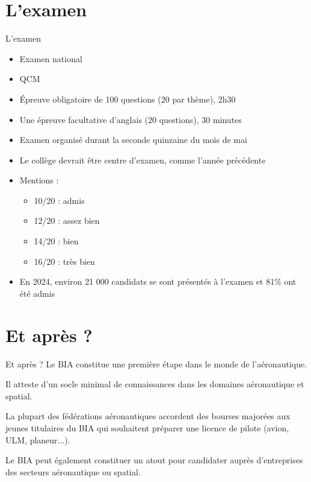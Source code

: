 \section{L'examen}
\begin{frame}{L'examen}
\begin{itemize}
	\item Examen national
	\item QCM
	\item Épreuve obligatoire de 100 questions (20 par thème), 2h30
	\item Une épreuve facultative d'anglais (20 questions), 30 minutes
	\item Examen organisé durant la seconde quinzaine du mois de mai
	\item Le collège devrait être centre d'examen, comme l'année précédente
	\item Mentions :
	\begin{itemize}
		\item 10/20 : admis
		\item 12/20 : assez bien
		\item 14/20 : bien
		\item 16/20 : très bien
	\end{itemize}
	\item En 2024, environ 21 000 candidats se sont présentés à l'examen et 81\% ont été admis
\end{itemize}
\end{frame}

\section{Et après ?}
\begin{frame}{Et après ?}
Le BIA constitue une première étape dans le monde de l'aéronautique.

Il atteste d'un socle minimal de connaissances dans les domaines aéronautique et spatial.

La plupart des fédérations aéronautiques accordent des bourses majorées aux jeunes titulaires du BIA qui souhaitent préparer une licence de pilote (avion, ULM, planeur...).

Le BIA peut également constituer un atout pour candidater auprès d'entreprises des secteurs aéronautique ou spatial.
\end{frame}


